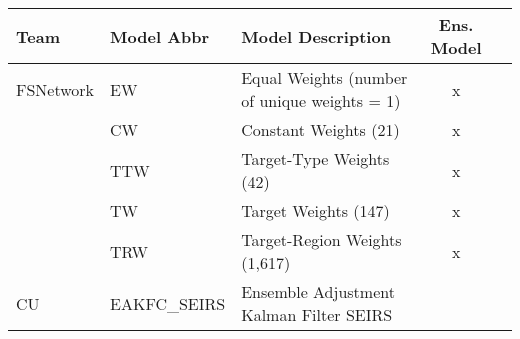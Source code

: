 \begin{table}
\setlength{\tabcolsep}{4pt} 
\begin{tabular}{p{1.6cm} l p{7.5cm} c  p{1cm}  }
\hline
Team     & Model Abbr& Model Description & Ens. Model &  \\ 
\hline
FSNetwork & EW       & Equal Weights (number of unique weights = 1) &  x & \\ 
 & CW       & Constant Weights (21) &   x & \\ 
 & TTW      & Target-Type Weights (42) & x & \\ 
 & TW       & Target Weights (147) &   x & \\ 
 & TRW      & Target-Region Weights (1,617)&  x & \\ 
\hline
CU       & EAKFC\_SEIRS       & Ensemble Adjustment Kalman Filter SEIRS && \cite{Pei2017}  \\ 


\end{tabular}
\end{table}

